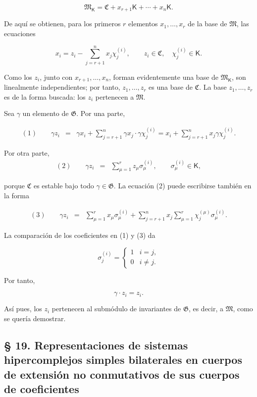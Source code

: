 \[
\mathfrak M_{\mathsf K}=\mathfrak C+x_{r+1}\mathsf K+\cdots+x_n\mathsf K.
\]

De aquí se obtienen, para los primeros \(r\) elementos \(x_1,\ldots,x_r\) de la base de \(\mathfrak M\), las ecuaciones

\[
x_i=z_i-\sum_{j=r+1}^{n}x_j\chi_j^{(i)},\qquad
z_i\in\mathfrak C,\quad \chi_j^{(i)}\in\mathsf K.
\]

Como los \(z_i\), junto con \(x_{r+1},\ldots,x_n\), forman evidentemente una base de \(\mathfrak M_{\mathsf K}\), son linealmente independientes; por tanto, \(z_1,\ldots,z_r\) es una base de \(\mathfrak C\). La base \(z_1,\ldots,z_r\) es de la forma buscada: los \(z_i\) pertenecen a \(\mathfrak M\).

Sea \(\gamma\) un elemento de \(\mathfrak G\). Por una parte,

\[
\begin{array}{rcl}
(1)\qquad \gamma z_i
&=&\gamma x_i+\displaystyle\sum_{j=r+1}^{n}\gamma x_j\cdot \gamma\chi_j^{(i)}
=x_i+\displaystyle\sum_{j=r+1}^{n}x_j\gamma\chi_j^{(i)}.
\end{array}
\]

Por otra parte,
\[
\begin{array}{rcl}
(2)\qquad \gamma z_i&=&\displaystyle\sum_{\mu=1}^{r}z_\mu\sigma_\mu^{(i)},
\qquad \sigma_\mu^{(i)}\in\mathsf K,
\end{array}
\]

porque \(\mathfrak C\) es estable bajo todo \(\gamma\in\mathfrak G\). La ecuación (2) puede escribirse también en la forma

\[
\begin{array}{rcl}
(3)\qquad \gamma z_i
&=&\displaystyle\sum_{\mu=1}^{r}x_\mu\sigma_\mu^{(i)}
+\displaystyle\sum_{j=r+1}^{n}x_j\sum_{\mu=1}^{r}\chi_j^{(\mu)}\sigma_\mu^{(i)}.
\end{array}
\]

La comparación de los coeficientes en (1) y (3) da

\[
\sigma_j^{(i)}=
\begin{cases}
1 & i=j,\\
0 & i\ne j.
\end{cases}
\]

Por tanto,

\[
\gamma\cdot z_i=z_i.
\]

Así pues, los \(z_i\) pertenecen al submódulo de invariantes de \(\mathfrak G\), es decir, a \(\mathfrak M\), como se quería demostrar.

\subsection*{§ 19. Representaciones de sistemas hipercomplejos simples bilaterales en cuerpos de extensión no conmutativos de sus cuerpos de coeficientes}\label{representaciones-de-sistemas-hipercomplejos-simples-bilaterales-en-cuerpos-de-extension-no-conmutativos-de-sus-cuerpos-de-coeficientes}

